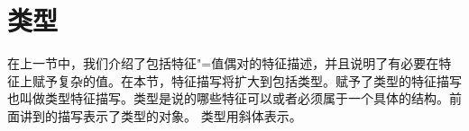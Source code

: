 \section{类型}
\label{sec-formalismus-typen}

在上一节中，我们介绍了包括特征"=值偶对的特征描述，并且说明了有必要在特征上赋予复杂的值。在本节，特征描写将扩大到包括类型。赋予了类型的特征描写也叫做类型特征描写。类型是说的哪些特征可以或者必须属于一个具体的结构。前面讲到的描写表示了类型的对象。
\ea
{}
\z
类型用斜体表示。

